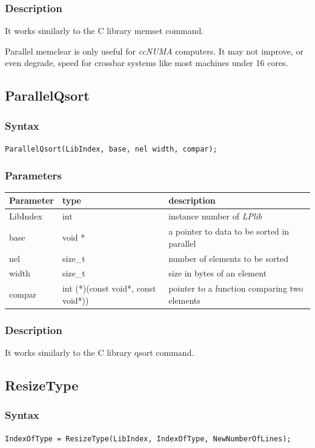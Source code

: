 \documentclass[a4paper,12pt]{article}
\begin{document}
\subsubsection*{Description}
It works similarly to the C library memset command.

Parallel memclear is only useful for \emph{ccNUMA} computers. It may not improve, or even degrade, speed for crossbar systems like most machines under 16 cores.


\subsection{ParallelQsort}

\subsubsection*{Syntax}
\tt{ParallelQsort(LibIndex, base, nel width, compar);}
\normalfont

\subsubsection*{Parameters}
\begin{tabular}{|m{2cm}|m{4cm}|m{8cm}|}
\hline
Parameter  & type   & description \\
\hline
LibIndex   & int    & instance number of \emph{LPlib} \\
\hline
base       & void * & a pointer to data to be sorted in parallel \\
\hline
nel        & size\_t & number of elements to be sorted \\
\hline
width      & size\_t & size in bytes of an element \\
\hline
compar     & int (*)(const void*, const void*)) & pointer to a function comparing two elements \\
\hline
\end{tabular}

\subsubsection*{Description}
It works similarly to the C library qsort command.


\subsection{ResizeType}

\subsubsection*{Syntax}
\tt{IndexOfType = ResizeType(LibIndex, IndexOfType, NewNumberOfLines);}
\normalfont
\end{document}
